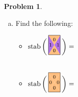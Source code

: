 \documentclass[12pt]{article}
\theoremstyle{definition} %
\newtheorem{problem}{Problem}
\begin{document}
\begin{problem}
\begin{enumerate}[(a)]
    
  \item Find the following:
    \begin{multicols}{2}
    \begin{itemize}
    \item $\stab\bigg(
        \begin{tikzpicture}[yscale=1.618,scale=.6,baseline=2ex]
          \tikzstyle{every node}=[font=\scriptsize]
          \path[fill=lpurple] (.5,.5)--(1,1)--(1,0);
          \path[fill=lorange] (.5,.5)--(0,1)--(1,1);
          \path[fill=lpurple] (.5,.5)--(0,0)--(0,1);
          \path[fill=lorange] (.5,.5)--(0,0)--(1,0);
          \draw (.5,.78) node{$0$}; 
          \draw (.18,.5) node{$1$}; \draw (.82,.5) node{$1$}; 
          \draw (.5,.22) node{$0$};
          \draw (0,0) rectangle (1,1);
        \end{tikzpicture}\bigg)=$ \\ \\
        
      \item $\stab\bigg(
        \begin{tikzpicture}[yscale=1.618,scale=.6,baseline=2ex]
          \tikzstyle{every node}=[font=\scriptsize]
          \path[fill=lorange] (.5,.5)--(0,1)--(1,1);
          \path[fill=lorange] (.5,.5)--(1,1)--(1,0);
          \path[fill=lorange] (.5,.5)--(0,0)--(1,0);
          \path[fill=lorange] (.5,.5)--(0,0)--(0,1);
          \draw (.5,.78) node{$0$}; 
          \draw (.18,.5) node{$0$}; \draw (.82,.5) node{$0$}; 
          \draw (.5,.22) node{$0$};
          \draw (0,0) rectangle (1,1);
      \end{tikzpicture}\bigg)=$ \\ \\


\end{itemize}
\end{multicols}
\end{enumerate}
\end{problem}
\end{document}
